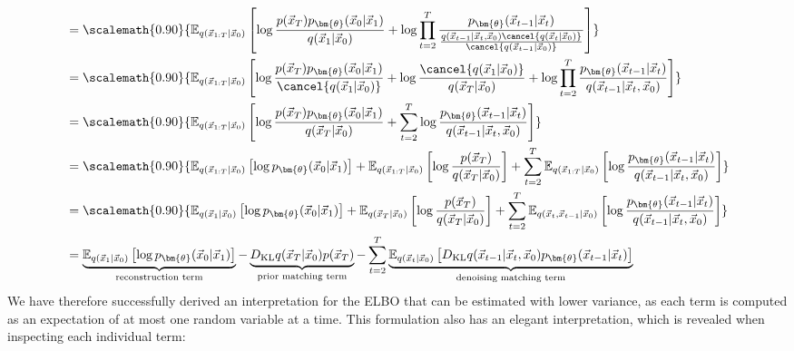 \begin{align}
&= \scalemath{0.90}{\mathbb{E}_{q(\vec{x}_{1:T}|\vec{x}_0)}\left[\log \frac{p(\vec{x}_T)p_{\bm{\theta}}(\vec{x}_0|\vec{x}_1)}{q(\vec{x}_1|\vec{x}_0)} + \log \prod_{t=2}^{T}\frac{p_{\bm{\theta}}(\vec{x}_{t-1}|\vec{x}_t)}{\frac{q(\vec{x}_{t-1}|\vec{x}_{t}, \vec{x}_0)\cancel{q(\vec{x}_t|\vec{x}_0)}}{\cancel{q(\vec{x}_{t-1}|\vec{x}_0)}}}\right]}\\
&= \scalemath{0.90}{\mathbb{E}_{q(\vec{x}_{1:T}|\vec{x}_0)}\left[\log \frac{p(\vec{x}_T)p_{\bm{\theta}}(\vec{x}_0|\vec{x}_1)}{\cancel{q(\vec{x}_1|\vec{x}_0)}} + \log \frac{\cancel{q(\vec{x}_1|\vec{x}_0)}}{q(\vec{x}_T|\vec{x}_0)} + \log \prod_{t=2}^{T}\frac{p_{\bm{\theta}}(\vec{x}_{t-1}|\vec{x}_t)}{q(\vec{x}_{t-1}|\vec{x}_{t}, \vec{x}_0)}\right]}\\
&= \scalemath{0.90}{\mathbb{E}_{q(\vec{x}_{1:T}|\vec{x}_0)}\left[\log \frac{p(\vec{x}_T)p_{\bm{\theta}}(\vec{x}_0|\vec{x}_1)}{q(\vec{x}_T|\vec{x}_0)} +  \sum_{t=2}^{T}\log\frac{p_{\bm{\theta}}(\vec{x}_{t-1}|\vec{x}_t)}{q(\vec{x}_{t-1}|\vec{x}_{t}, \vec{x}_0)}\right]}\\
&= \scalemath{0.90}{\mathbb{E}_{q(\vec{x}_{1:T}|\vec{x}_0)}\left[\log p_{\bm{\theta}}(\vec{x}_0|\vec{x}_1)\right] + \mathbb{E}_{q(\vec{x}_{1:T}|\vec{x}_0)}\left[\log \frac{p(\vec{x}_T)}{q(\vec{x}_T|\vec{x}_0)}\right] + \sum_{t=2}^{T}\mathbb{E}_{q(\vec{x}_{1:T}|\vec{x}_0)}\left[\log\frac{p_{\bm{\theta}}(\vec{x}_{t-1}|\vec{x}_t)}{q(\vec{x}_{t-1}|\vec{x}_{t}, \vec{x}_0)}\right]}\\
&= \scalemath{0.90}{\mathbb{E}_{q(\vec{x}_{1}|\vec{x}_0)}\left[\log p_{\bm{\theta}}(\vec{x}_0|\vec{x}_1)\right] + \mathbb{E}_{q(\vec{x}_{T}|\vec{x}_0)}\left[\log \frac{p(\vec{x}_T)}{q(\vec{x}_T|\vec{x}_0)}\right] + \sum_{t=2}^{T}\mathbb{E}_{q(\vec{x}_{t}, \vec{x}_{t-1}|\vec{x}_0)}\left[\log\frac{p_{\bm{\theta}}(\vec{x}_{t-1}|\vec{x}_t)}{q(\vec{x}_{t-1}|\vec{x}_{t}, \vec{x}_0)}\right]}\\
&= {\underbrace{\mathbb{E}_{q(\vec{x}_{1}|\vec{x}_0)}\left[\log p_{\bm{\theta}}(\vec{x}_0|\vec{x}_1)\right]}_\text{reconstruction term} - \underbrace{D_{\rm{KL}}{q(\vec{x}_T|\vec{x}_0)}{p(\vec{x}_T)}}_\text{prior matching term} - \sum_{t=2}^{T} \underbrace{\mathbb{E}_{q(\vec{x}_{t}|\vec{x}_0)}\left[D_{\rm{KL}}{q(\vec{x}_{t-1}|\vec{x}_t, \vec{x}_0)}{p_{\bm{\theta}}(\vec{x}_{t-1}|\vec{x}_t)}\right]}_\text{denoising matching term}} \label{eq:51}
\end{align}
\endgroup
We have therefore successfully derived an interpretation for the ELBO that can be estimated with lower variance, as each term is computed as an expectation of at most one random variable at a time.  This formulation also has an elegant interpretation, which is revealed when inspecting each individual term:
